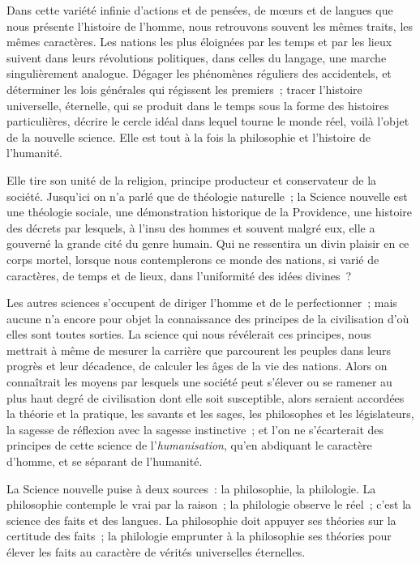 \documentclass[french,twoside]{book} %
\begin{document}
\par
 Dans cette variété infinie d’actions et de pensées, de mœurs et de langues que nous présente l’histoire de l’homme, nous retrouvons souvent les mêmes traits, les mêmes caractères. Les nations les plus éloignées par les temps et par les lieux suivent dans leurs révolutions politiques, dans celles du langage, une marche singulièrement analogue. Dégager les phénomènes réguliers des accidentels, et déterminer les lois générales qui régissent les premiers ; tracer l’histoire universelle, éternelle, qui se produit dans le temps sous la forme des histoires particulières, décrire le cercle idéal dans lequel tourne le monde réel, voilà l’objet de la nouvelle science. Elle est tout à la fois la philosophie et l’histoire de l’humanité.\par
Elle tire son unité de la religion, principe producteur et conservateur de la société. Jusqu’ici on n’a parlé que de théologie naturelle ; la Science nouvelle est une théologie sociale, une démonstration historique de la Providence, une histoire des décrets par lesquels, à l’insu des hommes et souvent malgré eux, elle a gouverné la grande cité du genre humain. Qui ne ressentira un divin plaisir en ce corps mortel, lorsque nous contemplerons ce monde des nations, si varié de caractères, de temps  et de lieux, dans l’uniformité des idées divines ?\par
Les autres sciences s’occupent de diriger l’homme et de le perfectionner ; mais aucune n’a encore pour objet la connaissance des principes de la civilisation d’où elles sont toutes sorties. La science qui nous révélerait ces principes, nous mettrait à même de mesurer la carrière que parcourent les peuples dans leurs progrès et leur décadence, de calculer les âges de la vie des nations. Alors on connaîtrait les moyens par lesquels une société peut s’élever ou se ramener au plus haut degré de civilisation dont elle soit susceptible, alors seraient accordées la théorie et la pratique, les savants et les sages, les philosophes et les législateurs, la sagesse de réflexion avec la sagesse instinctive ; et l’on ne s’écarterait des principes de cette science de l’{\itshape humanisation}, qu’en abdiquant le caractère d’homme, et se séparant de l’humanité.\par
\par
La Science nouvelle puise à deux sources : la philosophie, la philologie. La philosophie contemple le vrai par la raison ; la philologie observe le réel ; c’est la science des faits et des langues. La philosophie doit appuyer ses théories sur la certitude des faits ; la philologie emprunter à la philosophie ses théories pour élever les faits au caractère de vérités universelles éternelles.\par
\end{document}
